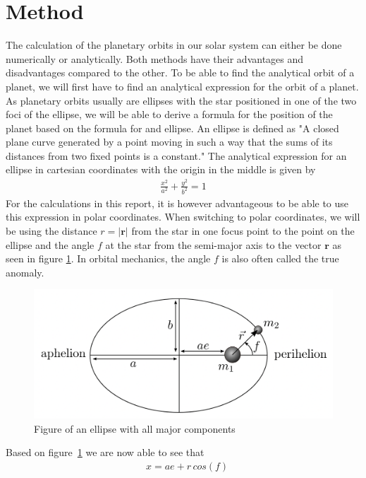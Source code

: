 \documentclass[reprint,english,notitlepage]{revtex4-2}
\begin{document}
\section{Method}
The calculation of the planetary orbits in our solar system can either be done numerically or analytically.
Both methods have their advantages and disadvantages compared to the other.
To be able to find the analytical orbit of a planet, we will first have to find an analytical expression for the orbit of a planet.
As planetary orbits usually are ellipses with the star positioned in one of the two foci of the ellipse, we will be able to derive a formula for the position of the planet based on the formula for and ellipse.
An ellipse is defined as "A closed plane curve generated by a point moving in such a way that the sums of its distances from two fixed points is a constant."%
The analytical expression for an ellipse in cartesian coordinates with the origin in the middle is given by
\begin{align}
    \frac{x^2}{a^2} + \frac{y^2}{b^2} = 1 \label{ellipse_analytic_cart}
\end{align}
For the calculations in this report, it is however advantageous to be able to use this expression in polar coordinates.
When switching to polar coordinates, we will be using the distance $r = |\textbf{r}|$ from the star in one focus point to the point on the ellipse and the angle $f$ at the star from the semi-major axis to the vector $\textbf{r}$ as seen in figure \ref{fig:Ellipse_fig}.
In orbital mechanics, the angle $f$ is also often called the true anomaly.
\begin{figure}[h]
	\centering
	\includegraphics[scale=0.3]{Figures/Ellipse}
	\caption{Figure of an ellipse with all major components}\label{fig:Ellipse_fig}
\end{figure}
Based on figure~\ref{fig:Ellipse_fig} we are now able to see that
\begin{align}
    &x = ae + r\,cos(f) \label{x_ellipse}
\end{align}
\end{document}
